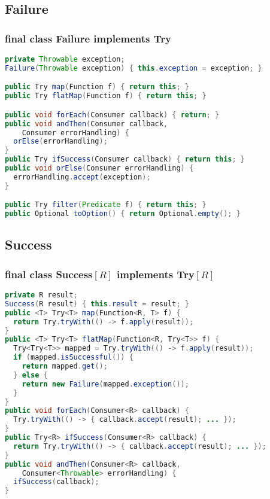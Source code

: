 \documentclass{beamer}
\begin{document}
\subsection{Failure}
\begin{frame}[fragile]
  \frametitle{final class Failure implements Try}
\begin{lstlisting}[language=Java]
private Throwable exception;
Failure(Throwable exception) { this.exception = exception; }

public Try map(Function f) { return this; }
public Try flatMap(Function f) { return this; }

public void forEach(Consumer callback) { return; }
public void andThen(Consumer callback, 
    Consumer errorHandling) {
  orElse(errorHandling);
}
public Try ifSuccess(Consumer callback) { return this; }
public void orElse(Consumer errorHandling) {
  errorHandling.accept(exception);
}

public Try filter(Predicate f) { return this; }
public Optional toOption() { return Optional.empty(); }   
\end{lstlisting}
\end{frame}

\subsection{Success}
\begin{frame}[fragile]
  \frametitle{final class Success$\left[R \right]$ implements Try$\left[R \right]$}
\begin{lstlisting}[language=Java]
private R result;
Success(R result) { this.result = result; }
public <T> Try<T> map(Function<R, T> f) {
  return Try.tryWith(() -> f.apply(result));
}
public <T> Try<T> flatMap(Function<R, Try<T>> f) {
  Try<Try<T>> mapped = Try.tryWith(() -> f.apply(result));
  if (mapped.isSuccessful()) {
    return mapped.get();
  } else {
    return new Failure(mapped.exception());
  }
}
public void forEach(Consumer<R> callback) {
  Try.tryWith(() -> { callback.accept(result); ... });
}
public Try<R> ifSuccess(Consumer<R> callback) {
  return Try.tryWith(() -> { callback.accept(result); ... });
}
public void andThen(Consumer<R> callback, 
    Consumer<Throwable> errorHandling) {
  ifSuccess(callback);
}
\end{lstlisting}
\end{frame}
\end{document}
